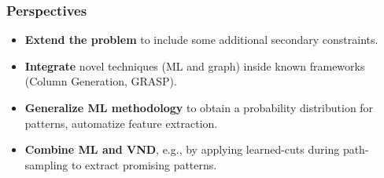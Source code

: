 \begin{frame}
\frametitle{\textbf{Perspectives}}
    \begin{itemize}[<+->]
      \item \textbf{Extend the problem} to include some additional secondary constraints.        
      \item \textbf{Integrate} novel techniques (ML and graph) inside known frameworks (Column Generation, GRASP).
      \item \textbf{Generalize ML methodology}
        to obtain a probability distribution for patterns, automatize feature extraction.
      \item \textbf{Combine ML and VND},
        e.g., by applying learned-cuts during path-sampling to extract promising patterns.
    \end{itemize}
\end{frame}

